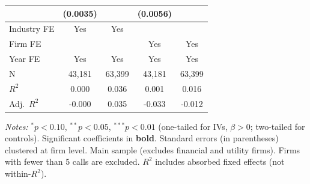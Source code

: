 \documentclass[11pt,a4paper]{article}
\begin{document}
\begin{table}[htbp]
\begin{tabular}{lcccc}
 & (0.0035) &  & (0.0056) &  \\
\midrule
Industry FE & Yes & Yes &  &  \\
Firm FE &  &  & Yes & Yes \\
Year FE & Yes & Yes & Yes & Yes \\
\midrule
N & 43,181 & 63,399 & 43,181 & 63,399 \\
$R^2$ & 0.000 & 0.036 & 0.001 & 0.016 \\
Adj.~$R^2$ & -0.000 & 0.035 & -0.033 & -0.012 \\
\bottomrule
\end{tabular}
\begin{minipage}{\linewidth}
\vspace{2pt}\scriptsize
\textit{Notes:} $^{*}p<0.10$, $^{**}p<0.05$, $^{***}p<0.01$ (one-tailed for IVs, $\beta > 0$; two-tailed for controls).
 Significant coefficients in \textbf{bold}.
 Standard errors (in parentheses) clustered at firm level.
 Main sample (excludes financial and utility firms). Firms with fewer than 5 calls are excluded.
 $R^2$ includes absorbed fixed effects (not within-$R^2$).
\end{minipage}
\end{table}
\clearpage
\end{document}
